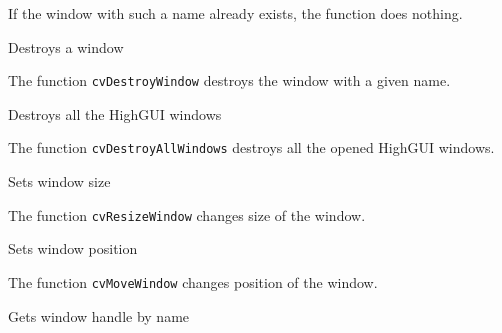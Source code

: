If the window with such a name already exists, the function does nothing.


Destroys a window


\begin{description}
\end{description}

The function \texttt{cvDestroyWindow} destroys the window with a given name.


Destroys all the HighGUI windows


The function \texttt{cvDestroyAllWindows} destroys all the opened HighGUI windows.


Sets window size


\begin{description}
\end{description}

The function \texttt{cvResizeWindow} changes size of the window.


Sets window position


\begin{description}
\end{description}

The function \texttt{cvMoveWindow} changes position of the window.


Gets window handle by name


